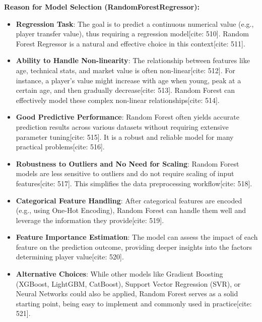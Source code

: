 \documentclass[12pt]{report}
\begin{document}
{{{\textbf*{Reason for Model Selection (RandomForestRegressor):}
\begin{itemize}
    \item \textbf{Regression Task}: The goal is to predict a continuous numerical value (e.g., player transfer value), thus requiring a regression model[cite: 510]. Random Forest Regressor is a natural and effective choice in this context[cite: 511].
    \item \textbf{Ability to Handle Non-linearity}: The relationship between features like age, technical stats, and market value is often non-linear[cite: 512]. For instance, a player's value might increase with age when young, peak at a certain age, and then gradually decrease[cite: 513]. Random Forest can effectively model these complex non-linear relationships[cite: 514].
    \item \textbf{Good Predictive Performance}: Random Forest often yields accurate prediction results across various datasets without requiring extensive parameter tuning[cite: 515]. It is a robust and reliable model for many practical problems[cite: 516].
    \item \textbf{Robustness to Outliers and No Need for Scaling}: Random Forest models are less sensitive to outliers and do not require scaling of input features[cite: 517]. This simplifies the data preprocessing workflow[cite: 518].
    \item \textbf{Categorical Feature Handling}: After categorical features are encoded (e.g., using One-Hot Encoding), Random Forest can handle them well and leverage the information they provide[cite: 519].
    \item \textbf{Feature Importance Estimation}: The model can assess the impact of each feature on the prediction outcome, providing deeper insights into the factors determining player value[cite: 520].
    \item \textbf{Alternative Choices}: While other models like Gradient Boosting (XGBoost, LightGBM, CatBoost), Support Vector Regression (SVR), or Neural Networks could also be applied, Random Forest serves as a solid starting point, being easy to implement and commonly used in practice[cite: 521].
\end{itemize}
}}}
\end{document}
